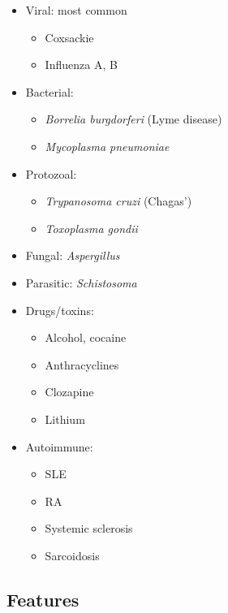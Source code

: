 \documentclass[
  12pt,
]{memoir}
\providecommand{\tightlist}{%
  \setlength{\itemsep}{0pt}\setlength{\parskip}{0pt}}
\begin{document}
\begin{itemize}
\tightlist
\item
  Viral: most common

  \begin{itemize}
  \tightlist
  \item
    Coxsackie
  \item
    Influenza A, B
  \end{itemize}
\item
  Bacterial:

  \begin{itemize}
  \tightlist
  \item
    \emph{Borrelia burgdorferi} (Lyme disease)
  \item
    \emph{Mycoplasma pneumoniae}
  \end{itemize}
\item
  Protozoal:

  \begin{itemize}
  \tightlist
  \item
    \emph{Trypanosoma cruzi} (Chagas')
  \item
    \emph{Toxoplasma gondii}
  \end{itemize}
\item
  Fungal: \emph{Aspergillus}
\item
  Parasitic: \emph{Schistosoma}
\item
  Drugs/toxins:

  \begin{itemize}
  \tightlist
  \item
    Alcohol, cocaine
  \item
    Anthracyclines
  \item
    Clozapine
  \item
    Lithium
  \end{itemize}
\item
  Autoimmune:

  \begin{itemize}
  \tightlist
  \item
    SLE
  \item
    RA
  \item
    Systemic sclerosis
  \item
    Sarcoidosis
  \end{itemize}
\end{itemize}

\hypertarget{features-13}{%
\subsection{Features}\label{features-13}}
\end{document}
